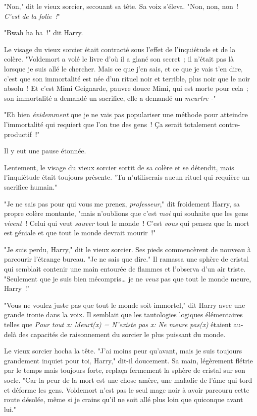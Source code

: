 "Non," dit le vieux sorcier, secouant sa tête. Sa voix s'éleva. "Non, non, non~! \emph{C'est de la folie~!}"

"Bwah ha ha~!" dit Harry.

Le visage du vieux sorcier était contracté sous l'effet de l'inquiétude et de la colère. "Voldemort a volé le livre d'où il a glané son secret~; il n'était pas là lorsque je suis allé le chercher. Mais ce que j'en sais, et ce que je vais t'en dire, c'est que son immortalité est née d'un rituel noir et terrible, plus noir que le noir absolu~! Et c'est Mimi Geignarde, pauvre douce Mimi, qui est morte pour cela~; son immortalité a demandé un sacrifice, elle a demandé un \emph{meurtre -}"

"Eh bien \emph{évidemment} que je ne vais pas populariser une méthode pour atteindre l'immortalité qui requiert que l'on tue des gens~! Ça serait totalement contre-productif~!"

Il y eut une pause étonnée.

Lentement, le visage du vieux sorcier sortit de sa colère et se détendit, mais l'inquiétude était toujours présente. "Tu n'utiliserais aucun rituel qui requière un sacrifice humain."

"Je ne sais pas pour qui vous me prenez, \emph{professeur}," dit froidement Harry, sa propre colère montante, "mais n'oublions que c'est \emph{moi} qui souhaite que les gens \emph{vivent}~! Celui qui veut \emph{sauver} tout le monde~! C'est \emph{vous} qui pensez que la mort est géniale et que tout le monde devrait mourir~!"

"Je suis perdu, Harry," dit le vieux sorcier. Ses pieds commencèrent de nouveau à parcourir l'étrange bureau. "Je ne sais que dire." Il ramassa une sphère de cristal qui semblait contenir une main entourée de flammes et l'observa d'un air triste. "Seulement que je suis bien mécompris… je ne \emph{veux} pas que tout le monde meure, Harry~!"

"Vous ne voulez juste pas que tout le monde soit immortel," dit Harry avec une grande ironie dans la voix. Il semblait que les tautologies logiques élémentaires telles que \emph{Pour tout x: Meurt(x) = N'existe pas x: Ne meure pas(x)} étaient au-delà des capacités de raisonnement du sorcier le plus puissant du monde.

Le vieux sorcier hocha la tête. "J'ai moins peur qu'avant, mais je suis toujours grandement inquiet pour toi, Harry," dit-il doucement. Sa main, légèrement flétrie par le temps mais toujours forte, replaça fermement la sphère de cristal sur son socle. "Car la peur de la mort est une chose amère, une maladie de l'âme qui tord et déforme les gens. Voldemort n'est pas le seul mage noir à avoir parcouru cette route désolée, même si je crains qu'il ne soit allé plus loin que quiconque avant lui."

